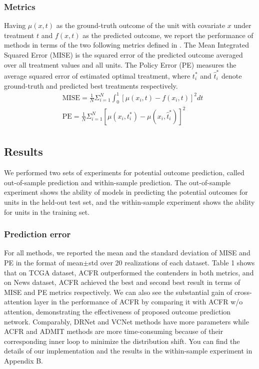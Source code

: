 \documentclass[letterpaper]{article} %
\begin{document}
\subsubsection{Metrics}
Having $\mu(x, t)$ as the ground-truth outcome of the unit with covariate $x$ under treatment $t$ and $f(x, t)$ as the predicted outcome, we report the performance of methods in terms of the two following metrics defined in \cite{Schwab_2020}. The Mean Integrated Squared Error (MISE) is the squared error of the predicted outcome averaged over all treatment values and all units. The Policy Error (PE) measures the average squared error of estimated optimal treatment, where $t_{i}^*$ and $\hat{t}_{i}^*$ denote ground-truth and predicted best treatments respectively.
\begin{align*}
    &\text{MISE} = \frac{1}{N}\Sigma_{i=1}^N \int_{0}^1 [\mu(x_i, t) - f(x_i, t)]^2 dt \\
    &\text{PE} = \frac{1}{N} \Sigma_{i=1}^N [\mu(x_i, t_{i}^*) - \mu(x_i, \hat{t}_{i}^*)]^2 \\
    & \quad \
\end{align*}
\subsection{Results}
We performed two sets of experiments for potential outcome prediction, called out-of-sample prediction and within-sample prediction. The out-of-sample experiment shows the ability of models in predicting the potential outcomes for units in the held-out test set, and the within-sample experiment shows the ability for units in the training set.
\subsubsection{Prediction error}
For all methods, we reported the mean and the standard deviation of MISE and PE in the format of mean$\pm$std over 20 realizations of each dataset.
Table 1 shows that on TCGA dataset, ACFR outperformed the contenders in both metrics, and on News dataset, ACFR achieved the best and second best result in terms of MISE and PE metrics respectively.
We can also see the substantial gain of cross-attention layer in the performance of ACFR by comparing it with ACFR w/o attention, demonstrating the effectiveness of proposed outcome prediction network.
Comparably, DRNet and VCNet methods have more parameters while ACFR and ADMIT methods are more time-consuming because of their corresponding inner loop to minimize the distribution shift. You can find the details of our implementation  and the results in the within-sample experiment in Appendix B.
\end{document}
